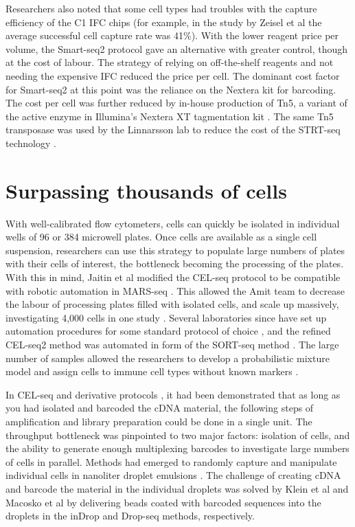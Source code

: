 Researchers also noted that some cell types had troubles with the capture efficiency of the C1 IFC chips (for example, in the study by Zeisel et al \cite{Zeisel2015-mk} the average successful cell capture rate was 41\%). With the lower reagent price per volume, the Smart-seq2 protocol gave an alternative with greater control, though at the cost of labour. The strategy of relying on off-the-shelf reagents and not needing the expensive IFC reduced the price per cell. The dominant cost factor for Smart-seq2 at this point was the reliance on the Nextera kit for barcoding. The cost per cell was further reduced by in-house production of Tn5, a variant of the active enzyme in Illumina’s Nextera XT tagmentation kit \cite{Picelli2014-ni}. The same Tn5 transposase was used by the Linnarsson lab to reduce the cost of the STRT-seq technology \cite{Islam2014-dx}.

\section{Surpassing thousands of cells}

With well-calibrated flow cytometers, cells can quickly be isolated in individual wells of 96 or 384 microwell plates. Once cells are available as a single cell suspension, researchers can use this strategy to populate large numbers of plates with their cells of interest, the bottleneck becoming the processing of the plates. With this in mind, Jaitin et al modified the CEL-seq protocol to be compatible with robotic automation in MARS-seq \cite{Jaitin2014-pk}. This allowed the Amit team to decrease the labour of processing plates filled with isolated cells, and scale up massively, investigating 4,000 cells in one study \cite{Jaitin2014-pk}. Several laboratories since have set up automation procedures for some standard protocol of choice \cite{Zeisel2015-mk, Soumillon2014-mf}, and the refined CEL-seq2 method \cite{Hashimshony2016-ul} was automated in form of the SORT-seq method \cite{Muraro2016-zt}. The large number of samples allowed the researchers to develop a probabilistic mixture model and assign cells to immune cell types without known markers \cite{Jaitin2014-pk}.

In CEL-seq and derivative protocols \cite{Hashimshony2012-am, Jaitin2014-pk, Hashimshony2016-ul, Velten2015-ve}, it had been demonstrated that as long as you had isolated and barcoded the cDNA material, the following steps of amplification and library preparation could be done in a single unit. The throughput bottleneck was pinpointed to two major factors: isolation of cells, and the ability to generate enough multiplexing barcodes to investigate large numbers of cells in parallel. Methods had emerged to randomly capture and manipulate individual cells in nanoliter droplet emulsions \cite{Mazutis2013-rd}. The challenge of creating cDNA and barcode the material in the individual droplets was solved by Klein et al \cite{Klein2015-ti} and Macosko et al \cite{Macosko2015-jb} by delivering beads coated with barcoded sequences into the droplets in the inDrop and Drop-seq methods, respectively.


